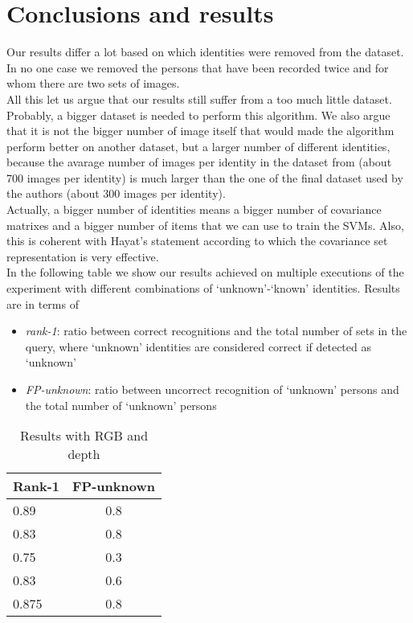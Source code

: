 \documentclass{article}
\begin{document}
\section{Conclusions and results}
Our results differ a lot based on which identities were removed from the dataset.
In no one case we removed the persons that have been recorded twice and for whom
there are two sets of images.
\\
All this let us argue that our results still suffer from a too much little
dataset. Probably, a bigger dataset is needed to perform this algorithm. We
also argue that it is not the bigger number of image itself that would made the
algorithm perform better on another dataset, but a larger number of different
identities, because the avarage number of images per identity in the dataset from
\citep{Fanelli2013} (about 700 images per identity) is much larger than the
one of the final dataset used by the authors (about 300 images per identity).
\\
Actually, a bigger number of identities means a bigger number of covariance
matrixes and a bigger number of items that we can use to train the SVMs. Also,
this is coherent with Hayat's statement according to which the covariance set
representation is very effective.
\\
In the following table we show our results achieved on multiple executions of
the experiment with different combinations of `unknown'-`known' identities.
Results are in terms of
\begin{itemize}
	\item \textit{rank-1}: ratio between correct recognitions and the
		total number of sets in the query, where `unknown'
		identities are considered correct if detected as `unknown'
	\item \textit{FP-unknown}: ratio between uncorrect recognition of
		`unknown' persons and the total number of `unknown' persons
\end{itemize}
\begin{table}[]
	\centering
	\caption{Results with RGB and depth}
	\label{tab:results-rgbd}
	\begin{tabular}{|l|c|}
		\hline
		\bf Rank-1 & \bf FP-unknown \\ \hline
		0.89	   & 0.8 \\ \hline
		0.83	   & 0.8 \\ \hline
		0.75	   & 0.3 \\ \hline
		0.83	   & 0.6 \\ \hline
		0.875      & 0.8 \\ \hline
	\end{tabular}
\end{table}
\end{document}
